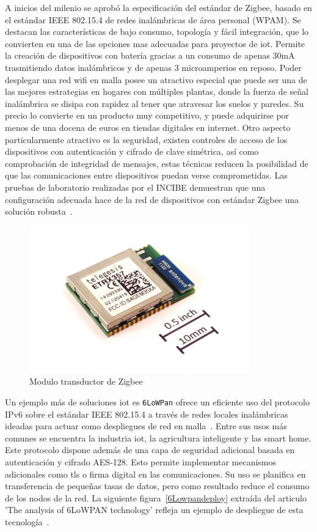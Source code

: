  A inicios del milenio se aprobó la especificación del estándar de Zigbee, basado en el estándar IEEE 802.15.4 de redes inalámbricas de área personal (WPAM). Se destacan las características de bajo consumo, topología y fácil integración, que lo convierten en una de las opciones mas adecuadas para proyectos de \gls{iot}. Permite la creación de dispositivos con batería gracias a un consumo de apenas 30mA  trasmitiendo datos inalámbricos y de apenas 3 microamperios en reposo. Poder desplegar una red \gls{wifi} en malla posee un atractivo especial que puede ser una de las mejores estrategias en hogares con múltiples plantas, donde la fuerza de señal inalámbrica se disipa con rapidez al tener que atravesar los suelos y paredes. Su precio lo convierte en un producto muy competitivo, y puede adquirirse por menos de una docena de euros en tiendas digitales en internet. Otro aspecto particularmente atractivo es la seguridad, existen controles de acceso de los dispositivos con autenticación y cifrado de clave simétrica, así como comprobación de integridad de mensajes, estas técnicas reducen la posibilidad de que las comunicaciones entre dispositivos puedan verse comprometidas. Las pruebas de laboratorio realizadas por el INCIBE demuestran que una configuración adecuada hace de la red de dispositivos con estándar Zigbee una solución robusta~\cite{incibe_zigbee}.
 
\begin{figure}[hbt!]
\centering
\includegraphics[height=2.5in]{figures/ETRX357_ZigBee_module_with_size_ref.jpg}
\caption[Modulo transductor de 2.4Gh Zigbee ETRX357]{Modulo transductor de Zigbee\footnotemark}
\end{figure}

\vspace{1cm}

Un ejemplo más de soluciones \gls{iot} es \verb|6LoWPan| ofrece un eficiente uso del protocolo IPv6 sobre el estándar IEEE 802.15.4 a través de redes locales inalámbricas ideadas para actuar como despliegues de red en malla~\cite{montenegro2007rfc}. Entre sus usos más comunes se encuentra la industria \gls{iot}, la agricultura inteligente y las smart home. Este protocolo dispone además de una capa de seguridad adicional basada en autenticación y cifrado AES-128. Esto permite implementar mecanismos adicionales como \gls{tls} o firma digital en las comunicaciones. Su uso se planifica en transferencia de pequeñas tasas de datos, pero como resultado reduce el consumo de los nodos de la red. La siguiente figura~\ref{6Lowpandeploy} extraída del articulo 'The analysis of 6LoWPAN technology' refleja un ejemplo de despliegue de esta tecnología~\cite{ma2008analysis}.

